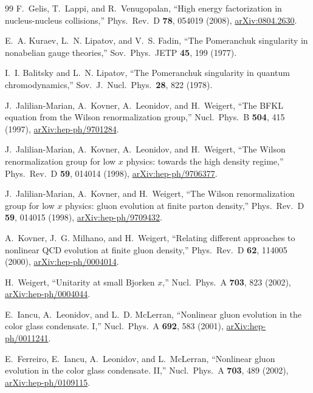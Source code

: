 \begin{thebibliography}{99}
F.~Gelis, T.~Lappi, and R.~Venugopalan, ``High energy factorization in nucleus-nucleus collisions,'' Phys.\ Rev.\ D \textbf{78}, 054019 (2008), \href{https://arxiv.org/abs/0804.2630}{arXiv:0804.2630}.

E.~A. Kuraev, L.~N. Lipatov, and V.~S. Fadin, ``The Pomeranchuk singularity in nonabelian gauge theories,'' Sov.\ Phys.\ JETP \textbf{45}, 199 (1977).

I.~I. Balitsky and L.~N. Lipatov, ``The Pomeranchuk singularity in quantum chromodynamics,'' Sov.\ J.\ Nucl.\ Phys.\ \textbf{28}, 822 (1978).

J.~Jalilian-Marian, A.~Kovner, A.~Leonidov, and H.~Weigert, ``The BFKL equation from the Wilson renormalization group,'' Nucl.\ Phys.\ B \textbf{504}, 415 (1997), \href{https://arxiv.org/abs/hep-ph/9701284}{arXiv:hep-ph/9701284}.

J.~Jalilian-Marian, A.~Kovner, A.~Leonidov, and H.~Weigert, ``The Wilson renormalization group for low $x$ physics: towards the high density regime,'' Phys.\ Rev.\ D \textbf{59}, 014014 (1998), \href{https://arxiv.org/abs/hep-ph/9706377}{arXiv:hep-ph/9706377}.

J.~Jalilian-Marian, A.~Kovner, and H.~Weigert, ``The Wilson renormalization group for low $x$ physics: gluon evolution at finite parton density,'' Phys.\ Rev.\ D \textbf{59}, 014015 (1998), \href{https://arxiv.org/abs/hep-ph/9709432}{arXiv:hep-ph/9709432}.

A.~Kovner, J.~G. Milhano, and H.~Weigert, ``Relating different approaches to nonlinear QCD evolution at finite gluon density,'' Phys.\ Rev.\ D \textbf{62}, 114005 (2000), \href{https://arxiv.org/abs/hep-ph/0004014}{arXiv:hep-ph/0004014}.

H.~Weigert, ``Unitarity at small Bjorken $x$,'' Nucl.\ Phys.\ A \textbf{703}, 823 (2002), \href{https://arxiv.org/abs/hep-ph/0004044}{arXiv:hep-ph/0004044}.

E.~Iancu, A.~Leonidov, and L.~D. McLerran, ``Nonlinear gluon evolution in the color glass condensate. I,'' Nucl.\ Phys.\ A \textbf{692}, 583 (2001), \href{https://arxiv.org/abs/hep-ph/0011241}{arXiv:hep-ph/0011241}.

E.~Ferreiro, E.~Iancu, A.~Leonidov, and L.~McLerran, ``Nonlinear gluon evolution in the color glass condensate. II,'' Nucl.\ Phys.\ A \textbf{703}, 489 (2002), \href{https://arxiv.org/abs/hep-ph/0109115}{arXiv:hep-ph/0109115}.


\end{thebibliography}
